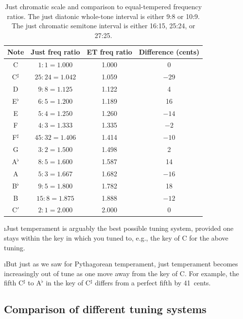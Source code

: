 \begin{table}[htbp]
\begin{center}
\begin{tabular}{|c|c|c|c|}
\hline
Note & Just freq ratio & ET freq ratio & Difference (cents) \\
\hline
C & $1:1 = 1.000$ & 1.000 & 0 \\
C$^\sharp$ & $25:24 = 1.042$ & 1.059 & $-29$ \\
D & $9:8=1.125$ & 1.122 & 4 \\
E$^\flat$ & $6:5=1.200$ & 1.189 & 16 \\
E & $5:4=1.250$ & 1.260 & $-14$ \\
F & $4:3=1.333$ & 1.335 & $-2$ \\
F$^\sharp$ & $45:32=1.406$ & 1.414 & $-10$ \\
G & $3:2=1.500$ & 1.498 & 2 \\
A$^\flat$ & $8:5=1.600$ & 1.587 & 14 \\
A & $5:3=1.667$ & 1.682 & $-16$ \\
B$^\flat$ & $9:5=1.800$ & 1.782 & 18 \\
B & $15:8=1.875$ & 1.888 & $-12$ \\
C$'$ & $2:1=2.000$ & 2.000 & 0 \\
\hline
\end{tabular}
\caption{Just chromatic scale and comparison to 
equal-tempered frequency ratios.
The just diatonic whole-tone interval is 
either 9:8 or 10:9.
The just chromatic semitone interval is 
either 16:15, 25:24, or 27:25.}
\label{t:just-chromatic}
\end{center}
\end{table}

\i Just temperament is arguably the best possible tuning 
system, provided one stays within the key in which 
you tuned to, e.g., the key of C for the above tuning.

\i But just as we saw for Pythagorean 
temperament, just temperament becomes increasingly out 
of tune as one move away from the key of C.
For example, the fifth C$^\sharp$ to A$^\flat$ in the
key of C$^\sharp$ differs from a perfect fifth by 41~cents.

\ei
\subsection{Comparison of different tuning systems}
\bi

